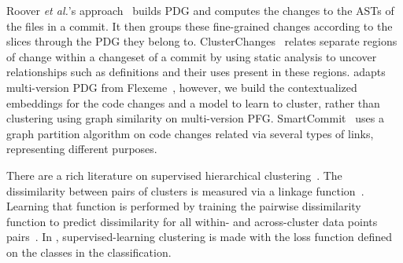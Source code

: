 \vspace{1pt}
 Roover {\em et al.}'s
approach~\cite{roover-scam18} builds PDG and computes the changes to
the ASTs of the files in a commit. It then groups these fine-grained
changes according to the slices through the PDG they belong to.
ClusterChanges~\cite{barnett-icse15} relates separate regions of
change within a changeset of a commit by using static analysis to
uncover relationships such as definitions and their uses present in
these regions. {\tool} adapts multi-version PDG from
Flexeme~\cite{flexeme-fse20}, however, we build the contextualized
embeddings for the code changes and a model to learn to cluster,
rather than clustering using graph similarity on multi-version PFG.
SmartCommit~\cite{smartcommit-fse21} uses a graph partition algorithm
on code changes related via several types of links, representing
different purposes.

There are a rich literature on supervised hierarchical
clustering~\cite{pmlr-v97-yadav19a,finley-icml05,liu13,GuhaIBB15,kenyon-dean-etal-2018-resolving,tie19}.
The dissimilarity between pairs of clusters is measured via a linkage
function~\cite{moseley-nips17,GuhaIBB15,pmlr-v97-yadav19a,lee-etal-2012-joint}. Learning
that function is performed by training the pairwise
dissimilarity function to predict dissimilarity for all within- and
across-cluster data points
pairs~\cite{pmlr-v97-yadav19a,kenyon-dean-etal-2018-resolving}. In
{\tool}, supervised-learning clustering is made with the loss function
defined on the classes in the classification.

